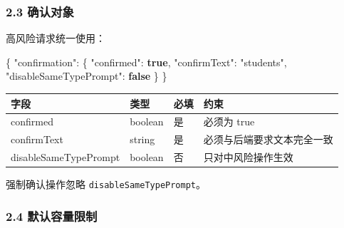 \documentclass[
  a4paper,
  UTF8]{ctexart}
\newenvironment{Shaded}{}{}
\newcommand{\DataTypeTok}[1]{\textcolor[rgb]{0.56,0.13,0.00}{#1}}
\newcommand{\FunctionTok}[1]{\textcolor[rgb]{0.02,0.16,0.49}{#1}}
\newcommand{\KeywordTok}[1]{\textcolor[rgb]{0.00,0.44,0.13}{\textbf{#1}}}
\newcommand{\StringTok}[1]{\textcolor[rgb]{0.25,0.44,0.63}{#1}}
\begin{document}
\hypertarget{ux786eux8ba4ux5bf9ux8c61}{%
\subsubsection{2.3 确认对象}\label{ux786eux8ba4ux5bf9ux8c61}}

高风险请求统一使用：

\begin{Shaded}
\begin{Highlighting}[]
\FunctionTok{\{}
  \DataTypeTok{"confirmation"}\FunctionTok{:} \FunctionTok{\{}
    \DataTypeTok{"confirmed"}\FunctionTok{:} \KeywordTok{true}\FunctionTok{,}
    \DataTypeTok{"confirmText"}\FunctionTok{:} \StringTok{"students"}\FunctionTok{,}
    \DataTypeTok{"disableSameTypePrompt"}\FunctionTok{:} \KeywordTok{false}
  \FunctionTok{\}}
\FunctionTok{\}}
\end{Highlighting}
\end{Shaded}

\begin{longtable}[]{@{}llll@{}}
\toprule
字段 & 类型 & 必填 & 约束 \\
\midrule
\endhead
confirmed & boolean & 是 & 必须为 true \\
confirmText & string & 是 & 必须与后端要求文本完全一致 \\
disableSameTypePrompt & boolean & 否 & 只对中风险操作生效 \\
\bottomrule
\end{longtable}

强制确认操作忽略 \texttt{disableSameTypePrompt}。

\hypertarget{ux9ed8ux8ba4ux5bb9ux91cfux9650ux5236}{%
\subsubsection{2.4
默认容量限制}\label{ux9ed8ux8ba4ux5bb9ux91cfux9650ux5236}}
\end{document}
